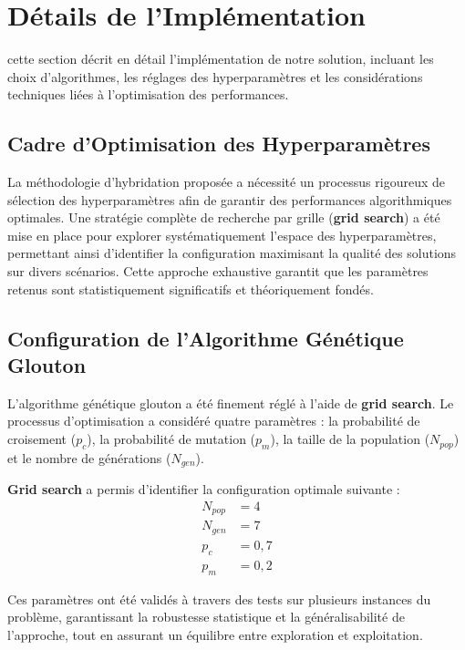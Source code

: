 \section{Détails de l’Implémentation}
 cette section décrit en détail l’implémentation de notre solution, incluant les choix d’algorithmes, les réglages des hyperparamètres et les considérations techniques liées à l’optimisation des performances.
\vspace{-0.8em}
\subsection{Cadre d’Optimisation des Hyperparamètres}

La méthodologie d’hybridation proposée a nécessité un processus rigoureux de sélection des hyperparamètres afin de garantir des performances algorithmiques optimales. Une stratégie complète de recherche par grille (\textbf{grid search}) a été mise en place pour explorer systématiquement l’espace des hyperparamètres, permettant ainsi d’identifier la configuration maximisant la qualité des solutions sur divers scénarios. Cette approche exhaustive garantit que les paramètres retenus sont statistiquement significatifs et théoriquement fondés.
\vspace{-0.5em}
\subsection{Configuration de l’Algorithme Génétique Glouton}

L’algorithme génétique glouton a été finement réglé à l’aide de \textbf{grid search}. Le processus d’optimisation a considéré quatre paramètres : la probabilité de croisement ($p_c$), la probabilité de mutation ($p_m$), la taille de la population ($N_{pop}$) et le nombre de générations ($N_{gen}$).

\textbf{Grid search} a permis d’identifier la configuration optimale suivante :
\begin{align}
	N_{pop} &= 4 \\
	N_{gen} &= 7 \\
	p_c &= 0{,}7 \\
	p_m &= 0{,}2
\end{align}

Ces paramètres ont été validés à travers des tests sur plusieurs instances du problème, garantissant la robustesse statistique et la généralisabilité de l’approche, tout en assurant un équilibre entre exploration et exploitation.
\vspace{-1em}
